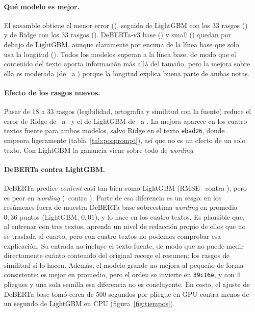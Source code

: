 \paragraph{Qué modelo es mejor.} El ensamble obtiene el menor error (\mcensamble), seguido de LightGBM con los 33 rasgos (\mclgbmenriquecido) y de Ridge con los 33 rasgos (\mcridgeenriquecido). DeBERTa-v3 base (\mcdebertabase) y small (\mcdebertasmall) quedan por debajo de LightGBM, aunque claramente por encima de la línea base que solo usa la longitud (\mcbaselinelongitud). Todos los modelos superan a la línea base, de modo que el contenido del texto aporta información más allá del tamaño, pero la mejora sobre ella es moderada (de \mcbaselinelongitud\ a \mcensamble) porque la longitud explica buena parte de ambas notas.

\paragraph{Efecto de los rasgos nuevos.} Pasar de 18 a 33 rasgos (legibilidad, ortografía y similitud con la fuente) reduce el error de Ridge de \mcridgebase\ a \mcridgeenriquecido\ y el de LightGBM de \mclgbmbase\ a \mclgbmenriquecido. La mejora aparece en los cuatro textos fuente para ambos modelos, salvo Ridge en el texto \texttt{ebad26}, donde empeora ligeramente (tabla~\ref{tab:porprompt}), así que no es un efecto de un solo texto. Con LightGBM la ganancia viene sobre todo de \emph{wording}.

\paragraph{DeBERTa contra LightGBM.} DeBERTa predice \emph{content} casi tan bien como LightGBM (RMSE \rcdebertabase\ contra \rclgbmenriquecido), pero es peor en \emph{wording} (\rwdebertabase\ contra \rwlgbmenriquecido). Parte de esa diferencia es un sesgo: en los resúmenes fuera de muestra DeBERTa base sobreestima \emph{wording} en promedio $0{,}36$ puntos (LightGBM, $0{,}01$), y lo hace en los cuatro textos. Es plausible que, al entrenar con tres textos, aprenda un nivel de redacción propio de ellos que no se traslada al cuarto, pero con cuatro textos no podemos comprobar esa explicación. Su entrada no incluye el texto fuente, de modo que no puede medir directamente cuánto contenido del original recoge el resumen; los rasgos de similitud sí lo hacen. Además, el modelo grande no mejora al pequeño de forma consistente: es mejor en promedio, pero el orden se invierte en \texttt{39c16e}, y con 4 pliegues y una sola semilla esa diferencia no es concluyente. En costo, el ajuste de DeBERTa base tomó cerca de 500 segundos por pliegue en GPU contra menos de un segundo de LightGBM en CPU (figura~\ref{fig:tiempos}).

